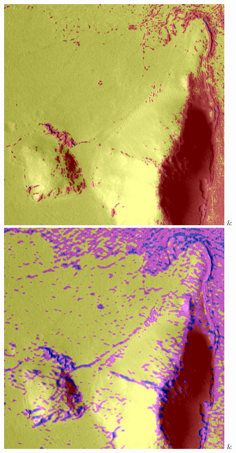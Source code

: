 \begin{table}[h!]
\begin{tabularx}{\textwidth}
		\includegraphics[width=0.9\linewidth]{images/gen/filter_size/p03_04.png_0.25.png} &
		\includegraphics[width=0.9\linewidth]{images/gen/filter_size/p03_04.png_0.50.png} &

\end{tabularx}
\end{table}
